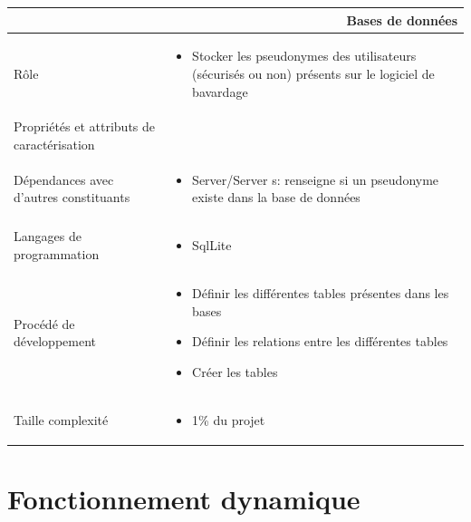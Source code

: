 \documentclass[a4paper,11pt,french]{article}
\begin{document}
\begin{center}
	\vspace*{0.7cm}
	\begin{tabularx}{16cm}{|l|X|}
	\hline
	\multicolumn{2}{|r|}{\textbf{Bases de données}}\\
	\hline
	R\^ole &  \begin{itemize}\item Stocker les pseudonymes des utilisateurs (sécurisés ou non) présents sur le logiciel de bavardage
 \end{itemize}\\
	\hline
	Propriétés et attributs de caractérisation & \\
	\hline
	Dépendances avec d'autres constituants & \begin{itemize}\item Server/Server s: renseigne si un pseudonyme existe dans la base de données \end{itemize} \\
	\hline
	Langages de programmation & \begin{itemize} \item SqlLite \end{itemize}\\
	\hline
	Procédé de développement & \begin{itemize}\item Définir les différentes tables présentes dans les bases \item Définir les relations entre les différentes tables \item Créer les tables \end{itemize}\\
	\hline
	Taille complexité & \begin{itemize}\item 1\% du projet \end{itemize}\\
	\hline
	\end{tabularx}
\end{center}

\section{Fonctionnement dynamique}
\end{document}
